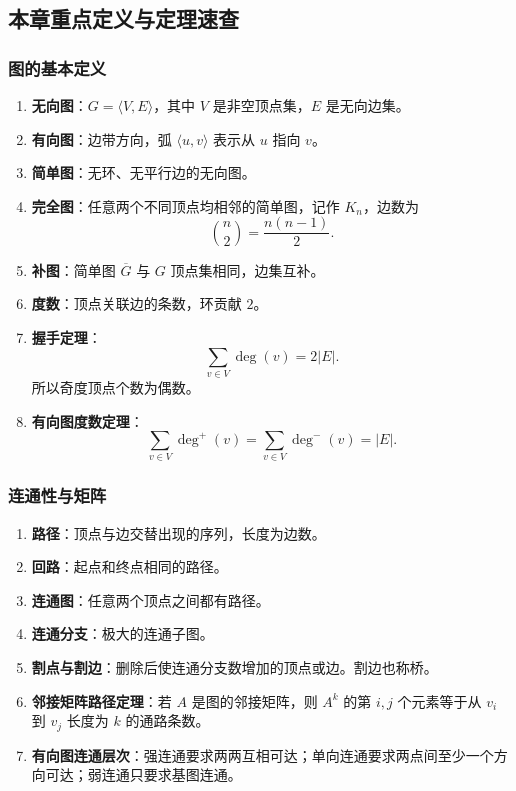 \subsection{本章重点定义与定理速查}

\subsubsection{图的基本定义}

\begin{enumerate}
	\item \textbf{无向图}：\(G=\langle V,E\rangle\)，其中 \(V\) 是非空顶点集，\(E\) 是无向边集。
	\item \textbf{有向图}：边带方向，弧 \(\langle u,v\rangle\) 表示从 \(u\) 指向 \(v\)。
	\item \textbf{简单图}：无环、无平行边的无向图。
	\item \textbf{完全图}：任意两个不同顶点均相邻的简单图，记作 \(K_n\)，边数为
	\[
	\binom n2=\frac{n(n-1)}2.
	\]
	\item \textbf{补图}：简单图 \(\overline G\) 与 \(G\) 顶点集相同，边集互补。
	\item \textbf{度数}：顶点关联边的条数，环贡献 \(2\)。
	\item \textbf{握手定理}：
	\[
	\sum_{v\in V}\deg(v)=2|E|.
	\]
	所以奇度顶点个数为偶数。
	\item \textbf{有向图度数定理}：
	\[
	\sum_{v\in V}\deg^+(v)=\sum_{v\in V}\deg^-(v)=|E|.
	\]
\end{enumerate}

\subsubsection{连通性与矩阵}

\begin{enumerate}
	\item \textbf{路径}：顶点与边交替出现的序列，长度为边数。
	\item \textbf{回路}：起点和终点相同的路径。
	\item \textbf{连通图}：任意两个顶点之间都有路径。
	\item \textbf{连通分支}：极大的连通子图。
	\item \textbf{割点与割边}：删除后使连通分支数增加的顶点或边。割边也称桥。
	\item \textbf{邻接矩阵路径定理}：若 \(A\) 是图的邻接矩阵，则 \(A^k\) 的第 \(i,j\) 个元素等于从 \(v_i\) 到 \(v_j\) 长度为 \(k\) 的通路条数。
	\item \textbf{有向图连通层次}：强连通要求两两互相可达；单向连通要求两点间至少一个方向可达；弱连通只要求基图连通。
\end{enumerate}

